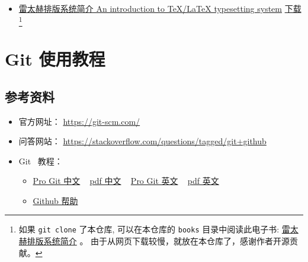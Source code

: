 \documentclass[cn,11pt, simple]{elegantbook}
\begin{document}
\begin{itemize}
\begin{itemize}
                \href{http://mirrors.ustc.edu.cn/CTAN/info/short-math-guide/short-math-guide.pdf}{英文下载}
                \footnote{如果 \lstinline{git clone} 了本仓库,
                可以在本仓库的 \lstinline{books}
                目录中阅读此电子书:
                \href{books/short-math-guide.pdf}
                {Short Math Guide for \LaTeX{}} 。
                由于从网页下载较慢，就放在本仓库了，感谢作者开源贡献。}
            \item \href{https://github.com/huangxg/lnotes}
                {雷太赫排版系统简介 An introduction to TeX/LaTeX
                typesetting system}
        \href{https://github.com/huangxg/lnotes/raw/master/lnotes2.pdf}{下载}
                \footnote{如果 \lstinline{git clone} 了本仓库,
                可以在本仓库的 \lstinline{books}
                目录中阅读此电子书:
                \href{books/lnotes2.pdf}{雷太赫排版系统简介} 。
                由于从网页下载较慢，就放在本仓库了，感谢作者开源贡献。}
        \end{itemize}
\end{itemize}



\chapter{Git 使用教程}%
\label{cha:git-tips}

\section{参考资料}%
\label{sec:git-refs}

\begin{itemize}
    \item 官方网址： \href{https://git-scm.com/}{https://git-scm.com/}
    \item 问答网站：
        \href{https://stackoverflow.com/questions/tagged/git+github}
        {https://stackoverflow.com/questions/tagged/git+github}
    \item Git~ 教程：
        \begin{itemize}
            \item \href{https://git-scm.com/book/zh/v2}
                {Pro Git 中文}
                ~ \href{books/progit_v2.1.31_zh.pdf}{pdf 中文}
                ~ \href{https://git-scm.com/book/en/v2} {Pro Git 英文}
                 ~ \href{books/progit_v2.1.177_en.pdf}{pdf 英文}
            \item \href{https://help.github.com/en/github}
                {Github 帮助}
        \end{itemize}
\end{itemize}
\end{document}
